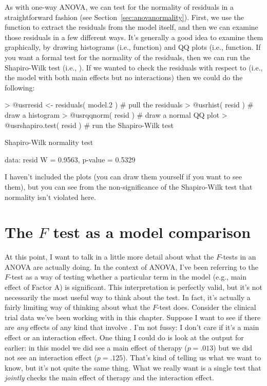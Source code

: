 
As with one-way ANOVA, we can test for the normality of residuals in a straightforward fashion (see Section~\ref{sec:anovanormality}). First, we use the  function to extract the residuals from the model itself, and then we can examine those residuals in a few different ways. It's generally a good idea to examine them graphically, by drawing histograms (i.e.,  function) and QQ plots (i.e.,  function. If you want a formal test for the normality of the residuals, then we can run the Shapiro-Wilk test (i.e., ). If we wanted to check the residuals with respect to  (i.e., the model with both main effects but no interactions) then we could do the following:
\begin{rblock1}
> @usr{resid <- residuals( model.2 )}  # pull the residuals
> @usr{hist( resid )}                  # draw a histogram
> @usr{qqnorm( resid )}                # draw a normal QQ plot
> @usr{shapiro.test( resid )}          # run the Shapiro-Wilk test

	Shapiro-Wilk normality test

data:  resid 
W = 0.9563, p-value = 0.5329
\end{rblock1}
I haven't included the plots (you can draw them yourself if you want to see them), but you can see from the non-significance of the Shapiro-Wilk test that normality isn't violated here.

\section{The $F$ test as a model comparison\label{sec:omnibusF}}

At this point, I want to talk in a little more detail about what the $F$-tests in an ANOVA are actually doing. In the context of ANOVA, I've been referring to the $F$-test as a way of testing whether a particular term in the model (e.g., main effect of Factor A) is significant. This interpretation is perfectly valid, but it's not necessarily the most useful way to think about the test. In fact, it's actually a fairly limiting way of thinking about what the $F$-test does. Consider the clinical trial data we've been working with in this chapter. Suppose I want to see if there are {\it any} effects of any kind that involve . I'm not fussy: I don't care if it's a main effect or an interaction effect. One thing I could do is look at the output for  earlier: in this model we did see a main effect of therapy ($p=.013$) but we did not see an interaction effect ($p=.125$). That's kind of telling us what we want to know, but it's not quite the same thing. What we really want is a single test that {\it jointly} checks the main effect of therapy and the interaction effect. 

